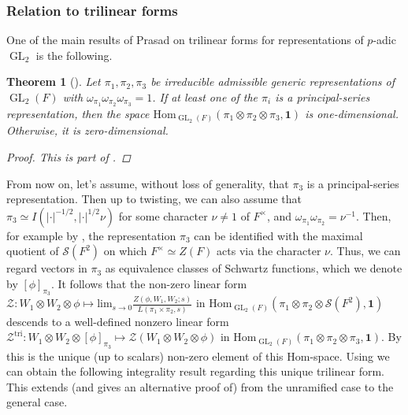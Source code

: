 \documentclass{amsart}
\theoremstyle{plain}
\newtheorem{thm}{Theorem}[subsection]
\theoremstyle{plain}
\theoremstyle{remark}
\DeclareMathOperator{\GL}{GL}
\begin{document}
\subsubsection{Relation to trilinear forms}
 One of the main results of Prasad \cite{prasad1990trilinear} on trilinear forms for representations of $p$-adic $\GL_2$ is the following.
\begin{thm}[\cite{prasad1990trilinear}]\label{thm prasad trilinear}
    Let $\pi_1,\pi_2,\pi_3$ be irreducible admissible generic representations of $\GL_2(F)$ with $\omega_{\pi_1}\omega_{\pi_2}\omega_{\pi_3}=1$. If at least one of the $\pi_i$ is a principal-series representation, then the space 
    $\mathrm{Hom}_{\GL_2(F)}(\pi_1\otimes\pi_2\otimes\pi_3,\mathbf{1})$
    is one-dimensional. Otherwise, it is zero-dimensional.
    \begin{proof}
        This is part of \cite[Theorem $1.1$ \& Theorem $1.2$]{prasad1990trilinear}.
    \end{proof}
\end{thm}
\noindent From now on, let's assume, without loss of generality, that $\pi_3$ is a principal-series representation. Then up to twisting, we can also assume that $\pi_3\simeq I(|\cdot|^{-1/2},|\cdot|^{1/2}\nu)$ for some character $\nu\neq 1$ of $F^\times$, and $\omega_{\pi_1}\omega_{\pi_2}=\nu^{-1}$. Then, for example by \cite[Proposition $3.3$]{loeffler2024local}, the representation $\pi_3$ can be identified with the maximal quotient of $\mathcal{S}(F^2)$ on which $F^\times\simeq Z(F)$ acts via the character $\nu$. Thus, we can regard vectors in $\pi_3$ as equivalence classes of Schwartz functions, which we denote by $[\phi]_{\pi_3}$. It follows that the non-zero linear form $\mathcal{Z}:W_1\otimes W_2\otimes \phi\mapsto \mathrm{lim}_{s\rightarrow0}\frac{Z(\phi,W_1,W_2;s)}{L(\pi_1\times\pi_2,s)}$ in $\mathrm{Hom}_{\GL_2(F)}(\pi_1\otimes\pi_2\otimes\mathcal{S}(F^2),\mathbf{1})$ descends to a well-defined nonzero linear form $\mathcal{Z}^{\mathrm{tri}}: W_1\otimes W_2\otimes [\phi]_{\pi_3}\mapsto \mathcal{Z}(W_1\otimes W_2\otimes\phi)$ in $\mathrm{Hom}_{\GL_2(F)}(\pi_1\otimes\pi_2\otimes\pi_3,\mathbf{1})$. By  this is the unique (up to scalars) non-zero element of this Hom-space. Using  we can obtain the following integrality result regarding this unique trilinear form. This extends (and gives an alternative proof of) \cite[Corollary $6.2.1(1)$ \& Corollary $6.3.1(1)$]{groutides2024rankinselbergintegralstructureseuler} from the unramified case to the general case. 
\end{document}
